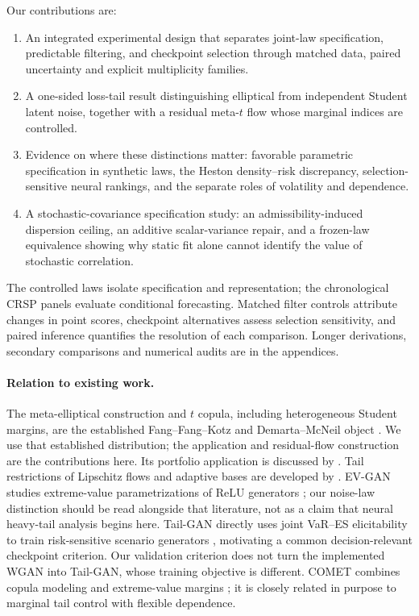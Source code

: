 \documentclass[11pt]{article}
\theoremstyle{definition}\newtheorem{definition}[theorem]{Definition}
\theoremstyle{remark}\newtheorem{remark}[theorem]{Remark}
\begin{document}
Our contributions are:
\begin{enumerate}
\item An integrated experimental design that separates joint-law specification, predictable filtering, and checkpoint selection through matched data, paired uncertainty and explicit multiplicity families.
\item A one-sided loss-tail result distinguishing elliptical from independent Student latent noise, together with a residual meta-$t$ flow whose marginal indices are controlled.
\item Evidence on where these distinctions matter: favorable parametric specification in synthetic laws, the Heston density--risk discrepancy, selection-sensitive neural rankings, and the separate roles of volatility and dependence.
\item A stochastic-covariance specification study: an admissibility-induced dispersion ceiling, an additive scalar-variance repair, and a frozen-law equivalence showing why static fit alone cannot identify the value of stochastic correlation.
\end{enumerate}
The controlled laws isolate specification and representation; the chronological CRSP panels evaluate conditional forecasting. Matched filter controls attribute changes in point scores, checkpoint alternatives assess selection sensitivity, and paired inference quantifies the resolution of each comparison. Longer derivations, secondary comparisons and numerical audits are in the appendices.

\paragraph{Relation to existing work.}
The meta-elliptical construction and $t$ copula, including heterogeneous Student margins, are the established Fang--Fang--Kotz and Demarta--McNeil object \citep{fang2002meta,demarta2005tcopula}. We use that established distribution; the application and residual-flow construction are the contributions here. Its portfolio application is discussed by \citet{noguer2025metat}. Tail restrictions of Lipschitz flows and adaptive bases are developed by \citet{jaini2020tails,laszkiewicz2022tail}. EV-GAN studies extreme-value parametrizations of ReLU generators \citep{allouche2022evgan}; our noise-law distinction should be read alongside that literature, not as a claim that neural heavy-tail analysis begins here. Tail-GAN directly uses joint VaR--ES elicitability to train risk-sensitive scenario generators \citep{cont2025tailgan}, motivating a common decision-relevant checkpoint criterion. Our validation criterion does not turn the implemented WGAN into Tail-GAN, whose training objective is different. COMET combines copula modeling and extreme-value margins \citep{mcdonald2022comet}; it is closely related in purpose to marginal tail control with flexible dependence.
\end{document}

